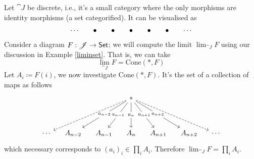 \begin{example}\label{prodinset}
Let $\cat{J}$ be discrete, i.e., it's a small category where the only morphisms are identity morphisms (a set categorified). It can be visualised as
\[\begin{tikzcd}[row sep=huge, column sep=small]
\cdots & \bullet & \bullet & \bullet & \bullet & \bullet & \cdots
\end{tikzcd}\]
Consider a diagram $F: \mathscr{J} \to \mathsf{Set}$; we will compute the limit $\lim_{\cat{J}}F$ using our discussion in Example \ref{liminset}. That is, we can take
\[\lim_{\cat{J}}F = \mathrm{Cone}(*,F)\]
Let $A_i \coloneqq F(i)$, we now investigate $\mathrm{Cone}(*,F)$. It's the set of a collection of maps as follows
\[\begin{tikzcd}[row sep=huge, column sep=small]
       &         &         & * \arrow[ld,"a_{n-1}" description] \arrow[d,"a_n" description] \arrow[rd,"a_{n+1}" description] \arrow[rrd,"a_{n+2}" description] \arrow[lld,"a_{n-2}" description] \arrow[rrrd, dashed] \arrow[llld, dashed] &         &         &        \\
\cdots & A_{n-2} & A_{n-1} & A_{n} & A_{n+1} & A_{n+2} & \cdots
\end{tikzcd}\]
which necessary corresponds to $(a_i)_i \in \prod_i A_i$. Therefore $\lim_{\cat{J}}F = \prod_i A_i$.
\end{example}

\vspace*{0.1in}

